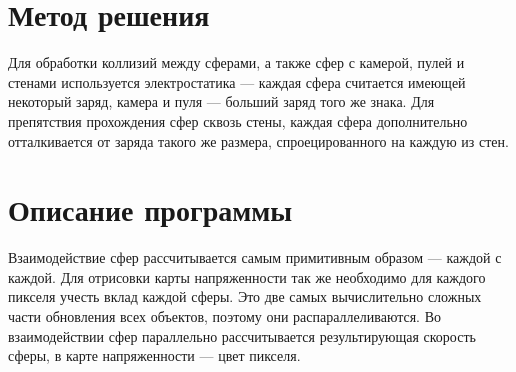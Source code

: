 \section{Метод решения}
Для обработки коллизий между сферами, а также сфер с камерой, пулей и стенами используется электростатика --- каждая сфера считается имеющей некоторый заряд, камера и пуля --- больший заряд того же знака. Для препятствия прохождения сфер сквозь стены, каждая сфера дополнительно отталкивается от заряда такого же размера, спроецированного на каждую из стен.

\section{Описание программы}
Взаимодействие сфер рассчитывается самым примитивным образом --- каждой с каждой. Для отрисовки карты напряженности так же необходимо для каждого пикселя учесть вклад каждой сферы. Это две самых вычислительно сложных части обновления всех объектов, поэтому они распараллеливаются. Во взаимодействии сфер параллельно рассчитывается результирующая скорость сферы, в карте напряженности --- цвет пикселя.
